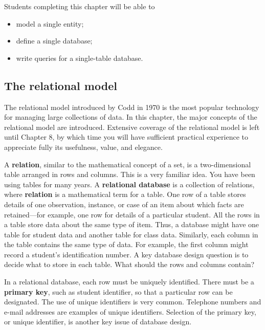 \documentclass[
]{article}
\begin{document}
Students completing this chapter will be able to

\begin{itemize}
\item
  model a single entity;
\item
  define a single database;
\item
  write queries for a single-table database.
\end{itemize}

\hypertarget{the-relational-model}{%
\subsection*{The relational model}\label{the-relational-model}}

The relational model introduced by Codd in 1970 is the most popular technology for managing large collections of data. In this chapter, the major concepts of the relational model are introduced. Extensive coverage of the relational model is left until Chapter 8, by which time you will have sufficient practical experience to appreciate fully its usefulness, value, and elegance.

A \textbf{relation}, similar to the mathematical concept of a set, is a two-dimensional table arranged in rows and columns. This is a very familiar idea. You have been using tables for many years. A \textbf{relational database} is a collection of relations, where \textbf{relation} is a mathematical term for a table. One row of a table stores details of one observation, instance, or case of an item about which facts are retained---for example, one row for details of a particular student. All the rows in a table store data about the same type of item. Thus, a database might have one table for student data and another table for class data. Similarly, each column in the table contains the same type of data. For example, the first column might record a student's identification number. A key database design question is to decide what to store in each table. What should the rows and columns contain?

In a relational database, each row must be uniquely identified. There must be a \textbf{primary key}, such as student identifier, so that a particular row can be designated. The use of unique identifiers is very common. Telephone numbers and e-mail addresses are examples of unique identifiers. Selection of the primary key, or unique identifier, is another key issue of database design.
\end{document}
